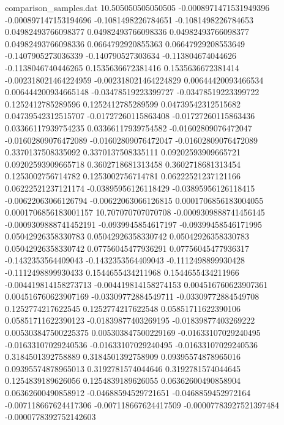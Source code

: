 \begin{filecontents}{comparison_samples.dat}
10.505050505050505  -0.0008971471531949396  -0.000897147153194696   -0.1081498226784651    -0.1081498226784653    0.04982493766098377    0.04982493766098336    0.04982493766098377    0.04982493766098336    0.0664792920855363     0.06647929208553649    -0.1407905273036339     -0.140790527303634      -0.113804674044626     -0.1138046740446265    0.1535636672381416      0.1535636672381414      -0.002318021464224959   -0.002318021464224829   0.00644420093466534     0.006444200934665148    -0.03478519223399727    -0.03478519223399722    0.1252412785289596      0.1252412785289599      0.04739542312515682     0.04739542312515707     -0.01727260115863408   -0.01727260115863436   0.03366117939754235    0.03366117939754582    -0.01602809076472047    -0.01602809076472089    -0.01602809076472047    -0.01602809076472089    0.3370137508335092     0.3370137508335111     0.09202593909665721     0.09202593909665718     0.3602718681313458     0.3602718681313454     0.1253002756714782      0.1253002756714781      0.06222521237121166     0.06222521237121174     -0.03895956126118429   -0.03895956126118415   -0.00622063066126794   -0.00622063066126815   0.0001706856183004055   0.0001706856183001157 
10.707070707070708  -0.0009309888741456145  -0.0009309888741452191  -0.0939945854617197    -0.09399458546171995   0.05042926358330783    0.05042926358330742    0.05042926358330783    0.05042926358330742    0.07756045477936291    0.07756045477936317    -0.1432353564409043     -0.1432353564409043     -0.1112498899930428    -0.1112498899930433    0.1544655434211968      0.1544655434211966      -0.004419814158273713   -0.004419814158274153   0.004516760623907361    0.004516760623907169    -0.03309772884549711    -0.03309772884549708    0.1252774217622545      0.1252774217622548      0.05851711622390106     0.05851711622390123     -0.01839877403269195   -0.01839877403269222   0.005303847500225375   0.005303847500229169   -0.01633107029240495    -0.01633107029240536    -0.01633107029240495    -0.01633107029240536    0.3184501392758889     0.3184501392758909     0.09395574878965016     0.09395574878965013     0.3192781574044646     0.3192781574044645     0.1254839189626056      0.1254839189626055      0.06362600490858904     0.06362600490858912     -0.04688594529721651   -0.0468859452972164    -0.007118667624417306  -0.007118667624417509  -0.00007783927521397484 -0.0000778392752142603

\end{filecontents}
